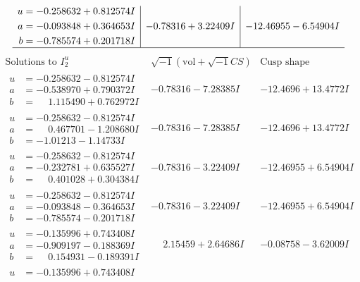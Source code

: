 \documentclass[1p]{elsarticle_modified}
\theoremstyle{definition}
\newcommand{\I}{\sqrt{-1}}
\begin{document}
$$\begin{array}{c|c|c}
\begin{aligned}
u &= -0.258632 + 0.812574 I \\
a &= -0.093848 + 0.364653 I \\
b &= -0.785574 + 0.201718 I\end{aligned}
 & -0.78316 + 3.22409 I & -12.46955 - 6.54904 I\\
 \hline 
 \end{array}$$\newpage$$\begin{array}{c|c|c}  
\text{Solutions to }I^u_{2}& \I (\text{vol} + \sqrt{-1}CS) & \text{Cusp shape}\\
 \hline 
\begin{aligned}
u &= -0.258632 - 0.812574 I \\
a &= -0.538970 + 0.790372 I \\
b &= \phantom{-}1.115490 + 0.762972 I\end{aligned}
 & -0.78316 - 7.28385 I & -12.4696 + 13.4772 I \\ \hline\begin{aligned}
u &= -0.258632 - 0.812574 I \\
a &= \phantom{-}0.467701 - 1.208680 I \\
b &= -1.01213 - 1.14733 I\end{aligned}
 & -0.78316 - 7.28385 I & -12.4696 + 13.4772 I \\ \hline\begin{aligned}
u &= -0.258632 - 0.812574 I \\
a &= -0.232781 + 0.635527 I \\
b &= \phantom{-}0.401028 + 0.304384 I\end{aligned}
 & -0.78316 - 3.22409 I & -12.46955 + 6.54904 I \\ \hline\begin{aligned}
u &= -0.258632 - 0.812574 I \\
a &= -0.093848 - 0.364653 I \\
b &= -0.785574 - 0.201718 I\end{aligned}
 & -0.78316 - 3.22409 I & -12.46955 + 6.54904 I \\ \hline\begin{aligned}
u &= -0.135996 + 0.743408 I \\
a &= -0.909197 - 0.188369 I \\
b &= \phantom{-}0.154931 - 0.189391 I\end{aligned}
 & \phantom{-}2.15459 + 2.64686 I & -0.08758 - 3.62009 I \\ \hline\begin{aligned}
u &= -0.135996 + 0.743408 I \\

\end{aligned}
\end{array}$$
\end{document}
